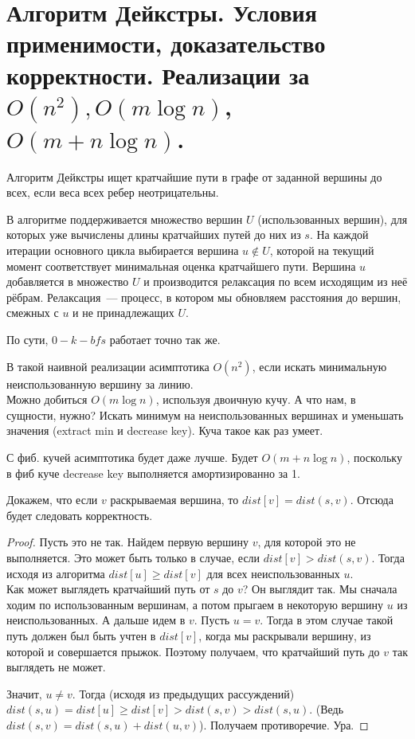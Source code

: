 \setcounter{section}{47}
\section{Алгоритм Дейкстры. Условия применимости, доказательство корректности. Реализации за $O(n^2), O(m \log n)$, 
$O(m + n \log n)$.}

Алгоритм Дейкстры ищет кратчайшие пути в графе от заданной вершины до всех, если веса всех ребер неотрицательны.

В алгоритме поддерживается множество вершин $U$ (использованных вершин), для которых уже вычислены длины кратчайших путей до них из $s$. На каждой итерации основного цикла выбирается вершина $u \notin U$, которой на текущий момент соответствует минимальная оценка кратчайшего пути. Вершина $u$ добавляется в множество $U$ и производится релаксация по всем исходящим из неё рёбрам. Релаксация~--- процесс, в котором мы обновляем расстояния до вершин, смежных с $u$ и не принадлежащих $U$. 



По сути, $0-k-bfs$ работает точно так же.

В такой наивной реализации асимптотика $O(n^2)$, если искать минимальную неиспользованную вершину за линию.\\

Можно добиться $O(m \log n)$, используя двоичную кучу. А что нам, в сущности, нужно? Искать минимум на неиспользованных вершинах и уменьшать значения (extract min и decrease key). Куча такое как раз умеет.

С фиб. кучей асимптотика будет даже лучше. Будет $O(m + n \log n)$, поскольку в фиб куче decrease key выполняется амортизированно за 1.

\begin{theorem}[Корректность]
Докажем, что если $v$ раскрываемая вершина, то $dist[v] = dist(s, v)$. Отсюда будет следовать корректность.
\end{theorem}

\begin{proof}
Пусть это не так. Найдем первую вершину $v$, для которой это не выполняется. Это может быть только в случае, если $dist[v] > dist(s, v)$. Тогда исходя из алгоритма $dist[u] \geq dist[v]$ для всех неиспользованных $u$.\\

Как может выглядеть кратчайший путь от $s$ до $v$? Он выглядит так. Мы сначала ходим по использованным вершинам, а потом прыгаем в некоторую вершину $u$ из неиспользованных. А дальше идем в $v$. Пусть $u = v$. Тогда в этом случае такой путь должен был быть учтен в $dist[v]$, когда мы раскрывали вершину, из которой и совершается прыжок. Поэтому получаем, что кратчайший путь до $v$ так выглядеть не может.

Значит, $u \neq v$. Тогда (исходя из предыдущих рассуждений) $dist(s, u) = dist[u] \geq dist[v] > dist(s, v) > dist(s, u)$. (Ведь $dist(s, v) = dist(s, u) + dist(u, v)$). Получаем противоречие. Ура.
\end{proof}

